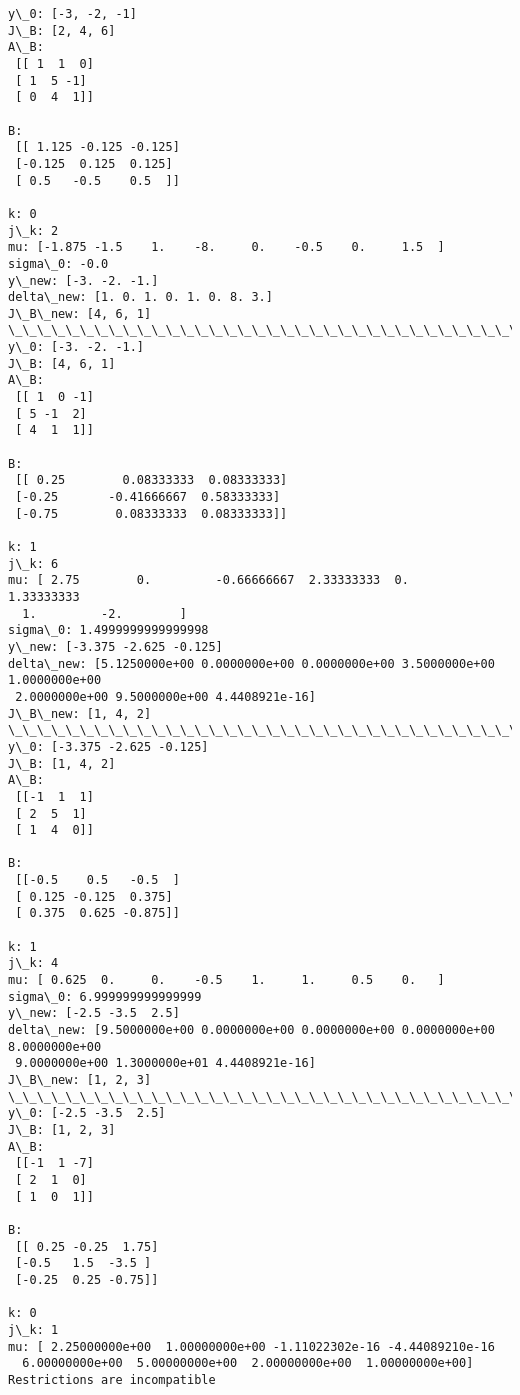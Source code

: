 \documentclass[11pt]{article}
\begin{document}
    \begin{Verbatim}[commandchars=\\\{\}]
y\_0: [-3, -2, -1]
J\_B: [2, 4, 6]
A\_B: 
 [[ 1  1  0]
 [ 1  5 -1]
 [ 0  4  1]]

B: 
 [[ 1.125 -0.125 -0.125]
 [-0.125  0.125  0.125]
 [ 0.5   -0.5    0.5  ]]

k: 0
j\_k: 2
mu: [-1.875 -1.5    1.    -8.     0.    -0.5    0.     1.5  ]
sigma\_0: -0.0
y\_new: [-3. -2. -1.]
delta\_new: [1. 0. 1. 0. 1. 0. 8. 3.]
J\_B\_new: [4, 6, 1]
\_\_\_\_\_\_\_\_\_\_\_\_\_\_\_\_\_\_\_\_\_\_\_\_\_\_\_\_\_\_\_\_\_\_\_\_\_\_\_\_\_\_\_\_\_\_\_\_\_\_\_\_\_\_\_\_\_\_\_\_\_\_\_\_\_\_\_\_\_\_\_\_\_\_\_\_\_\_\_\_\_\_\_\_\_\_\_\_\_\_\_\_\_\_\_\_\_\_\_\_
y\_0: [-3. -2. -1.]
J\_B: [4, 6, 1]
A\_B: 
 [[ 1  0 -1]
 [ 5 -1  2]
 [ 4  1  1]]

B: 
 [[ 0.25        0.08333333  0.08333333]
 [-0.25       -0.41666667  0.58333333]
 [-0.75        0.08333333  0.08333333]]

k: 1
j\_k: 6
mu: [ 2.75        0.         -0.66666667  2.33333333  0.          1.33333333
  1.         -2.        ]
sigma\_0: 1.4999999999999998
y\_new: [-3.375 -2.625 -0.125]
delta\_new: [5.1250000e+00 0.0000000e+00 0.0000000e+00 3.5000000e+00 1.0000000e+00
 2.0000000e+00 9.5000000e+00 4.4408921e-16]
J\_B\_new: [1, 4, 2]
\_\_\_\_\_\_\_\_\_\_\_\_\_\_\_\_\_\_\_\_\_\_\_\_\_\_\_\_\_\_\_\_\_\_\_\_\_\_\_\_\_\_\_\_\_\_\_\_\_\_\_\_\_\_\_\_\_\_\_\_\_\_\_\_\_\_\_\_\_\_\_\_\_\_\_\_\_\_\_\_\_\_\_\_\_\_\_\_\_\_\_\_\_\_\_\_\_\_\_\_
y\_0: [-3.375 -2.625 -0.125]
J\_B: [1, 4, 2]
A\_B: 
 [[-1  1  1]
 [ 2  5  1]
 [ 1  4  0]]

B: 
 [[-0.5    0.5   -0.5  ]
 [ 0.125 -0.125  0.375]
 [ 0.375  0.625 -0.875]]

k: 1
j\_k: 4
mu: [ 0.625  0.     0.    -0.5    1.     1.     0.5    0.   ]
sigma\_0: 6.999999999999999
y\_new: [-2.5 -3.5  2.5]
delta\_new: [9.5000000e+00 0.0000000e+00 0.0000000e+00 0.0000000e+00 8.0000000e+00
 9.0000000e+00 1.3000000e+01 4.4408921e-16]
J\_B\_new: [1, 2, 3]
\_\_\_\_\_\_\_\_\_\_\_\_\_\_\_\_\_\_\_\_\_\_\_\_\_\_\_\_\_\_\_\_\_\_\_\_\_\_\_\_\_\_\_\_\_\_\_\_\_\_\_\_\_\_\_\_\_\_\_\_\_\_\_\_\_\_\_\_\_\_\_\_\_\_\_\_\_\_\_\_\_\_\_\_\_\_\_\_\_\_\_\_\_\_\_\_\_\_\_\_
y\_0: [-2.5 -3.5  2.5]
J\_B: [1, 2, 3]
A\_B: 
 [[-1  1 -7]
 [ 2  1  0]
 [ 1  0  1]]

B: 
 [[ 0.25 -0.25  1.75]
 [-0.5   1.5  -3.5 ]
 [-0.25  0.25 -0.75]]

k: 0
j\_k: 1
mu: [ 2.25000000e+00  1.00000000e+00 -1.11022302e-16 -4.44089210e-16
  6.00000000e+00  5.00000000e+00  2.00000000e+00  1.00000000e+00]
Restrictions are incompatible

    \end{Verbatim}
\end{document}
